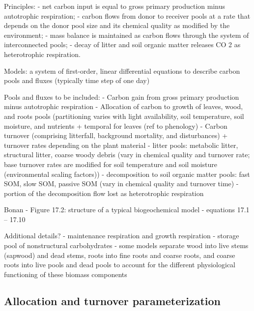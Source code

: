 \documentclass[12pt,oneside]{book}
\begin{document}
Principles: - net carbon input is equal to gross primary production
minus autotrophic respiration; - carbon flows from donor to receiver
pools at a rate that depends on the donor pool size and its chemical
quality as modified by the environment; - mass balance is maintained as
carbon flows through the system of interconnected pools; - decay of
litter and soil organic matter releases CO 2 as heterotrophic
respiration.

Models: a system of first-order, linear differential equations to
describe carbon pools and fluxes (typically time step of one day)

Pools and fluxes to be included: - Carbon gain from gross primary
production minus autotrophic respiration - Allocation of carbon to
growth of leaves, wood, and roots pools (partitioning varies with light
availability, soil temperature, soil moisture, and nutrients + temporal
for leaves (ref to phenology) - Carbon turnover (comprising litterfall,
background mortality, and disturbances) + turnover rates depending on
the plant material - litter pools: metabolic litter, structural litter,
coarse woody debris (vary in chemical quality and turnover rate; base
turnover rates are modified for soil temperature and soil moisture
(environmental scaling factors)) - decomposition to soil organic matter
pools: fast SOM, slow SOM, passive SOM (vary in chemical quality and
turnover time) - portion of the decomposition flow lost as heterotrophic
respiration

Bonan - Figure 17.2: structure of a typical biogeochemical model -
equations 17.1 -- 17.10

Additional details? - maintenance respiration and growth respiration -
storage pool of nonstructural carbohydrates - some models separate wood
into live stems (sapwood) and dead stems, roots into fine roots and
coarse roots, and coarse roots into live pools and dead pools to account
for the different physiological functioning of these biomass components

\subsection{Allocation and turnover
parameterization}\label{allocation-and-turnover-parameterization}
\end{document}
